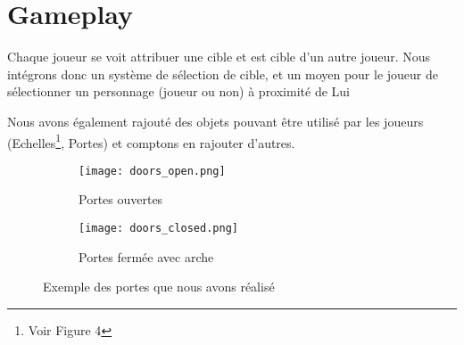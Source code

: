\documentclass[../doc.tex]{subfiles}
\begin{document}
\section{Gameplay}

Chaque joueur se voit attribuer une cible et est cible d'un autre joueur.
Nous intégrons donc un système de sélection de cible, et un moyen pour le joueur de sélectionner un personnage (joueur ou non) à proximité de Lui

Nous avons également rajouté des objets pouvant être utilisé par les joueurs
(Echelles\footnote{Voir Figure 4}, Portes) et comptons en rajouter d'autres.
\begin{figure}[hbt!]
    \centering
    \begin{subfigure}[t]{0.3\textwidth}
        \texttt{[image: doors\_open.png]} 
        \caption{Portes ouvertes}
    \end{subfigure}
    \hspace{50pt}
    \begin{subfigure}[t]{0.3\textwidth}
        \texttt{[image: doors\_closed.png]}
        \caption{Portes fermée avec arche}
    \end{subfigure}
    \caption{Exemple des portes que nous avons réalisé}
\end{figure}
\end{document}
